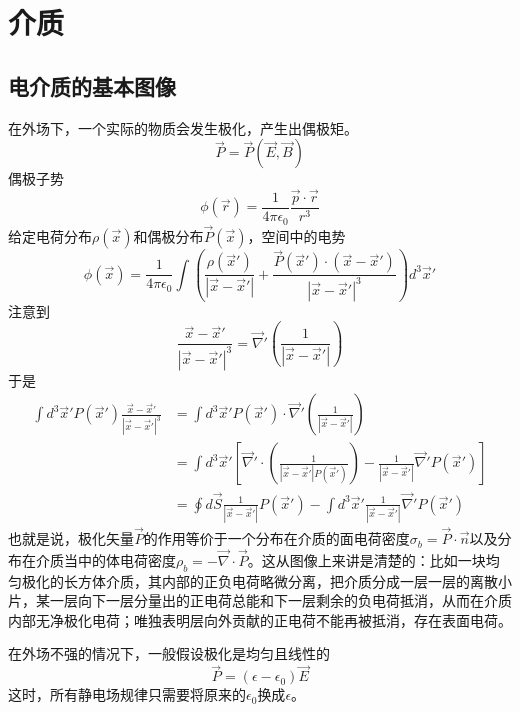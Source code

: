 \documentclass[a4paper,11pt]{ctexart}
\newcommand{\beq}{\begin{equation}}
\newcommand{\eeq}{\end{equation}}
\newcommand{\bea}{\begin{equation}\begin{aligned}}
\newcommand{\eea}{\end{aligned}\end{equation}}
\newcommand{\del}{\vec{\nabla}}
\newcommand{\epv}{\epsilon_0}
\begin{document}
\section{介质}
\subsection{电介质的基本图像}
在外场下，一个实际的物质会发生极化，产生出偶极矩。
\beq
\vec{P} = \vec P ( \vec E,\vec B)
\eeq
偶极子势
\beq
\phi(\vec r) = \frac{1}{4\pi \epv} \frac{\vec p \cdot \vec r}{r^3}
\eeq
给定电荷分布$\rho(\vec x)$和偶极分布$\vec P (\vec x)$，空间中的电势
\beq
\phi(\vec x) =  \frac{1}{4\pi \epv}  \int \left(\frac{\rho(\vec{x}')}{|\vec x - \vec{x}'|} + \frac{\vec P(\vec{x}') \cdot (\vec{x} - \vec{x}')}{|\vec x - \vec{x}'|^3} \right) d^3 \vec{x}'
\eeq
注意到
\beq
\frac{\vec x  - \vec{x}'}{|\vec x - \vec{x}'|^3} = \del' \left( \frac{1}{|\vec x - \vec{x}'|}\right)
\eeq
于是
\bea
\int d^3 \vec{x}' P(\vec{x}') \frac{\vec x  - \vec{x}'}{|\vec x - \vec{x}'|^3} &= \int d^3 \vec{x}' P(\vec{x}')\cdot \del' \left( \frac{1}{|\vec x - \vec{x}'|}\right) \\
&= \int d^3 \vec{x}' \left[ \del' \cdot \left( \frac{1}{|\vec x - \vec{x}'|P(\vec{x}')}\right)  - \frac{1}{|\vec x - \vec{x}'|} \del' P(\vec{x}')\right]\\
&=\oint d\vec S \frac{1}{|\vec x - \vec{x}'|}P(\vec{x}')- \int d^3 \vec{x}' \frac{1}{|\vec x - \vec{x}'|} \del' P(\vec{x}')
\eea
也就是说，极化矢量$\vec P$的作用等价于一个分布在介质的面电荷密度$\sigma_b = \vec P \cdot \vec n$以及分布在介质当中的体电荷密度$\rho_b = -\del \cdot \vec P$。这从图像上来讲是清楚的：比如一块均匀极化的长方体介质，其内部的正负电荷略微分离，把介质分成一层一层的离散小片，某一层向下一层分量出的正电荷总能和下一层剩余的负电荷抵消，从而在介质内部无净极化电荷；唯独表明层向外贡献的正电荷不能再被抵消，存在表面电荷。
\par
在外场不强的情况下，一般假设极化是均匀且线性的
\beq
\vec P = (\epsilon - \epv) \vec E
\eeq
这时，所有静电场规律只需要将原来的$\epv$换成$\epsilon$。
\end{document}
